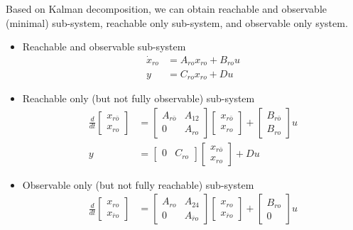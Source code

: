 \documentclass[twoside]{article}
\begin{document}
Based on Kalman decomposition, we can obtain reachable and observable (minimal) sub-system, reachable only sub-system, and observable only system.
\begin{itemize}
    \item Reachable and observable sub-system
    \begin{align*}
        \dot{x}_{ro} &= A_{ro} x_{ro} + B_{ro} u
        \\
        y &= C_{ro} x_{ro} + D u
    \end{align*}
    \item Reachable only (but not fully observable) sub-system
    \begin{align*}
        \frac{d}{dt}\begin{bmatrix} x_{r\bar{o}} \\ x_{ro}\end{bmatrix} &= 
        \left[ \begin{array}{c|c} A_{r\bar{o}} & A_{12} \\ \hline 
    0 & A_{ro}  \end{array} \right]
    \begin{bmatrix} x_{r\bar{o}} \\ x_{ro}\end{bmatrix} + \left[ \begin{array}{c} B_{r\bar{o}} \\ B_{ro} \end{array} \right] u
        \\
        y &= \left[ \begin{array}{c|c} 0 & C_{ro} \end{array} \right] \begin{bmatrix} x_{r\bar{o}} \\ x_{ro}\end{bmatrix}  + D u
    \end{align*}
    \item Observable only (but not fully reachable) sub-system
    \begin{align*}
        \frac{d}{dt}\begin{bmatrix} x_{ro} \\ x_{\bar{r}o}\end{bmatrix} &= 
        \left[ \begin{array}{c|c} A_{ro} & A_{24} \\ \hline 
    0 & A_{\bar{r}o}  \end{array} \right]
    \begin{bmatrix} x_{ro} \\ x_{\bar{r}o}\end{bmatrix} + \left[ \begin{array}{c} B_{ro} \\ 0 \end{array} \right] u

\end{align*}
\end{itemize}
\end{document}
